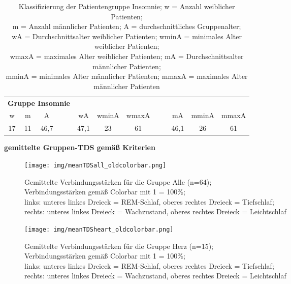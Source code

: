 \begin{table}[H] 
\centering
\begin{tabularx}{0.91\textwidth}{ccccccccccc}
\toprule
\multicolumn{4}{c}{\textbf{Gruppe Insomnie}} & & & & & & &\\  
\cmidrule{1-4}
w  & m  & A    &    & wA   & wminA & wmaxA &    & mA   & mminA & mmaxA\\
\midrule
17 & 11 & 46,7 & ~~ & 47,1 & 23    & 61    & ~~ & 46,1 & 26    & 61\\
\bottomrule
\end{tabularx}
\caption[Gruppe Insomnie]{Klassifizierung der Patientengruppe Insomnie; w = Anzahl weiblicher Patienten;\\m = Anzahl männlicher Patienten; A = durchschnittliches Gruppenalter;\\wA = Durchschnittsalter weiblicher Patienten; wminA = minimales Alter weiblicher Patienten;\\wmaxA = maximales Alter weiblicher Patienten; mA = Durchschnittsalter männlicher Patienten;\\mminA = minimales Alter männlicher Patienten; mmaxA = maximales Alter männlicher Patienten}
\label{tab:Insomnie}
\end{table}



\textbf{gemittelte Gruppen-TDS gemäß Kriterien}

\begin{figure}[H]
	\centering
	\texttt{[image: img/meanTDSall\_oldcolorbar.png]}
	\caption[Verbindungsstärken für die Gruppe Alle]{Gemittelte Verbindungsstärken für die Gruppe Alle (n=64);\\Verbindungsstärken gemäß Colorbar mit 1 = 100\%;\\links: unteres linkes Dreieck = \acs{REM}-Schlaf, oberes rechtes Dreieck = Tiefschlaf;\\rechts: unteres linkes Dreieck = Wachzustand, oberes rechtes Dreieck = Leichtschlaf}
	\label{fig:meanTDSall}
\end{figure}



\begin{figure}[H]
	\centering
	\texttt{[image: img/meanTDSheart\_oldcolorbar.png]}
	\caption[Verbindungsstärken für die Gruppe Herz]{Gemittelte Verbindungsstärken für die Gruppe Herz (n=15);\\Verbindungsstärken gemäß Colorbar mit 1 = 100\%;\\links: unteres linkes Dreieck = \acs{REM}-Schlaf, oberes rechtes Dreieck = Tiefschlaf;\\rechts: unteres linkes Dreieck = Wachzustand, oberes rechtes Dreieck = Leichtschlaf}
	\label{fig:meanTDSheart}
\end{figure}

